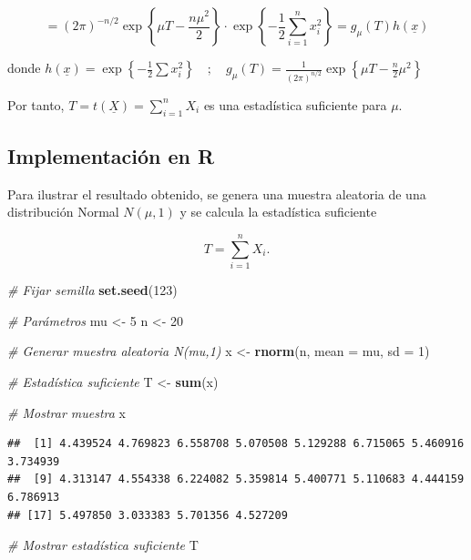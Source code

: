 \documentclass[
  11pt,
]{report}
\newenvironment{Shaded}{\begin{snugshade}}{\end{snugshade}}
\newcommand{\AttributeTok}[1]{\textcolor[rgb]{0.13,0.29,0.53}{#1}}
\newcommand{\CommentTok}[1]{\textcolor[rgb]{0.56,0.35,0.01}{\textit{#1}}}
\newcommand{\DecValTok}[1]{\textcolor[rgb]{0.00,0.00,0.81}{#1}}
\newcommand{\FunctionTok}[1]{\textcolor[rgb]{0.13,0.29,0.53}{\textbf{#1}}}
\newcommand{\NormalTok}[1]{#1}
\newcommand{\OtherTok}[1]{\textcolor[rgb]{0.56,0.35,0.01}{#1}}
\begin{document}
\[= (2\pi)^{-n/2} \exp\left\{ \mu T - \frac{n\mu^2}{2} \right\} \cdot \exp\left\{ -\frac{1}{2}\sum_{i=1}^n x_i^2 \right\} = g_\mu(T)h(\underline{x})\]

donde
\(h(\underline{x}) = \exp\left\{ -\frac{1}{2}\sum x_i^2 \right\} \quad ; \quad g_\mu(T) = \frac{1}{(2\pi)^{n/2}} \exp\left\{ \mu T - \frac{n}{2}\mu^2 \right\}\)

Por tanto, \(T = t(\underline{X}) = \sum_{i=1}^n X_i\) es una
estadística suficiente para \(\mu\).

\subsection{Implementación en R}\label{implementaciuxf3n-en-r}

Para ilustrar el resultado obtenido, se genera una muestra aleatoria de
una distribución Normal \(N(\mu,1)\) y se calcula la estadística
suficiente

\[T=\sum_{i=1}^{n}X_i.\]

\begin{Shaded}
\begin{Highlighting}[]
\CommentTok{\# Fijar semilla}
\FunctionTok{set.seed}\NormalTok{(}\DecValTok{123}\NormalTok{)}

\CommentTok{\# Parámetros}
\NormalTok{mu }\OtherTok{\textless{}{-}} \DecValTok{5}
\NormalTok{n }\OtherTok{\textless{}{-}} \DecValTok{20}

\CommentTok{\# Generar muestra aleatoria N(mu,1)}
\NormalTok{x }\OtherTok{\textless{}{-}} \FunctionTok{rnorm}\NormalTok{(n, }\AttributeTok{mean =}\NormalTok{ mu, }\AttributeTok{sd =} \DecValTok{1}\NormalTok{)}

\CommentTok{\# Estadística suficiente}
\NormalTok{T }\OtherTok{\textless{}{-}} \FunctionTok{sum}\NormalTok{(x)}

\CommentTok{\# Mostrar muestra}
\NormalTok{x}
\end{Highlighting}
\end{Shaded}

\begin{verbatim}
##  [1] 4.439524 4.769823 6.558708 5.070508 5.129288 6.715065 5.460916 3.734939
##  [9] 4.313147 4.554338 6.224082 5.359814 5.400771 5.110683 4.444159 6.786913
## [17] 5.497850 3.033383 5.701356 4.527209
\end{verbatim}

\begin{Shaded}
\begin{Highlighting}[]
\CommentTok{\# Mostrar estadística suficiente}
\NormalTok{T}
\end{Highlighting}
\end{Shaded}
\end{document}
